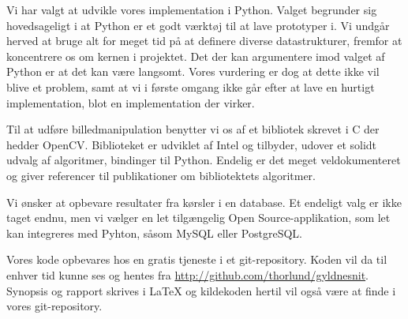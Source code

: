 Vi har valgt at udvikle vores implementation i Python. Valget begrunder
sig hovedsageligt i at Python er et godt værktøj til at lave prototyper
i. Vi undgår herved at bruge alt for meget tid på at definere diverse
datastrukturer, fremfor at koncentrere os om kernen i projektet. Det der
kan argumentere imod valget af Python er at det kan være langsomt. Vores
vurdering er dog at dette ikke vil blive et problem, samt at vi i første
omgang ikke går efter at lave en hurtigt implementation, blot en
implementation der virker.

Til at udføre billedmanipulation benytter vi os af et bibliotek skrevet i
C der hedder OpenCV. Biblioteket er udviklet af Intel og tilbyder, udover
et solidt udvalg af algoritmer, bindinger til Python. Endelig er det
meget veldokumenteret og giver referencer til publikationer om
bibliotektets algoritmer.

Vi ønsker at opbevare resultater fra kørsler i en database. Et endeligt
valg er ikke taget endnu, men vi vælger en let tilgængelig Open
Source-applikation, som let kan integreres med Pyhton, såsom MySQL eller
PostgreSQL.

Vores kode opbevares hos en gratis tjeneste i et git-repository. Koden
vil da til enhver tid kunne ses og hentes fra
\href{http://github.com/thorlund/gyldnesnit}{http://github.com/thorlund/gyldnesnit}.
Synopsis og rapport skrives i \LaTeX{} og kildekoden hertil vil også være
at finde i vores git-repository.
